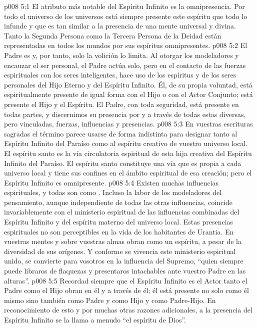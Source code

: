 \vs p008 5:1 El atributo más notable del Espíritu Infinito es la omnipresencia. Por todo el universo de los universos está siempre presente este espíritu que todo lo infunde y que es tan similar a la presencia de una mente universal y divina. Tanto la Segunda Persona como la Tercera Persona de la Deidad están representadas en todos los mundos por sus espíritus omnipresentes.
\vs p008 5:2 El Padre es  y, por tanto, solo la volición lo limita. Al otorgar los modeladores y encauzar el ser personal, el Padre actúa solo, pero en el contacto de las fuerzas espirituales con los seres inteligentes, hace uso de los espíritus y de los seres personales del Hijo Eterno y del Espíritu Infinito. Él, de su propia voluntad, está espiritualmente presente de igual forma con el Hijo o con el Actor Conjunto; está presente  el Hijo y  el Espíritu. El Padre, con toda seguridad, está presente en todas partes, y discernimos su presencia por y a través de todas estas diversas, pero vinculadas, fuerzas, influencias y presencias.
\vs p008 5:3 \pc En vuestras escrituras sagradas el término  parece usarse de forma indistinta para designar tanto al Espíritu Infinito del Paraíso como al espíritu creativo de vuestro universo local. El espíritu santo es la vía circulatoria espiritual de esta hija creativa del Espíritu Infinito del Paraíso. El espíritu santo constituye una vía que es propia a cada universo local y tiene sus confines en el ámbito espiritual de esa creación; pero el Espíritu Infinito es omnipresente.
\vs p008 5:4 \pc Existen muchas influencias espirituales, y todas son como . Incluso la labor de los modeladores del pensamiento, aunque independiente de todas las otras influencias, coincide invariablemente con el ministerio espiritual de las influencias combinadas del Espíritu Infinito y del espíritu materno del universo local. Estas presencias espirituales no son perceptibles en la vida de los habitantes de Urantia. En vuestras mentes y sobre vuestras almas obran como un espíritu, a pesar de la diversidad de sus orígenes. Y conforme se vivencia este ministerio espiritual unido, se convierte para vosotros en la influencia del Supremo, “quien siempre puede libraros de flaquezas y presentaros intachables ante vuestro Padre en las alturas”.
\vs p008 5:5 Recordad siempre que el Espíritu Infinito es el Actor  tanto el Padre como el Hijo obran en él y a través de él; él está presente no solo como él mismo sino también como Padre y como Hijo y como Padre\hyp{}Hijo. En reconocimiento de esto y por muchas otras razones adicionales, a la presencia del Espíritu Infinito se la llama a menudo “el espíritu de Dios”.
